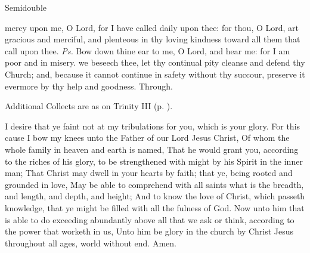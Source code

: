 \begin{inhead}
{Semidouble}
\end{inhead}
\par\noindent
{}


\introit
{} mercy upon me, O Lord, for I have called daily upon thee: for thou, O Lord, art gracious and merciful, and plenteous in thy loving kindness toward all them that call upon thee. \textit{Ps.} Bow down thine ear to me, O Lord, and hear me: for I am poor and in misery.
\collect
{} we beseech thee, let thy continual pity cleanse and defend thy Church; and, because it cannot continue in safety without thy succour, preserve it evermore by thy help and goodness. Through.
\begin{rubric}
    Additional Collects are as on Trinity III (p. \pageref{TrinityIII}).
\end{rubric}

 I desire that ye faint not at my tribulations for you, which is your glory. For this cause I bow my knees unto the Father of our Lord Jesus Christ, Of whom the whole family in heaven and earth is named, That he would grant you, according to the riches of his glory, to be strengthened with might by his Spirit in the inner man; That Christ may dwell in your hearts by faith; that ye, being rooted and grounded in love, May be able to comprehend with all saints what is the breadth, and length, and depth, and height; And to know the love of Christ, which passeth knowledge, that ye might be filled with all the fulness of God. Now unto him that is able to do exceeding abundantly above all that we ask or think, according to the power that worketh in us, Unto him be glory in the church by Christ Jesus throughout all ages, world without end. Amen.


